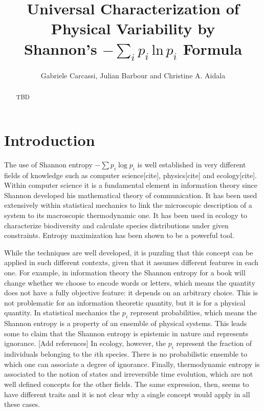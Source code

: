 \documentclass{article}
\title{Universal Characterization of Physical Variability by \\Shannon's $-\sum_ip_i\,\textrm{ln}\,p_i$ Formula}
\author{
	Gabriele Carcassi,
	Julian Barbour and
	Christine A. Aidala 
}
\begin{document}
\maketitle

\tableofcontents

\begin{abstract}
TBD
\end{abstract}




\section{Introduction\label{int}}

The use of Shannon entropy $-\sum p_i \log p_i$ is well established in very different fields of knowledge such as computer science[cite], physics[cite] and ecology[cite]. Within computer science it is a fundamental element in information theory since Shannon developed his mathematical theory of communication. It has been used extensively within statistical mechanics to link the microscopic description of a system to its macroscopic thermodynamic one. It has been used in ecology to characterize biodiversity and calculate species distributions under given constraints. Entropy maximization has been shown to be a powerful tool.

While the techniques are well developed, it is puzzling that this concept can be applied in such different contexts, given that it assumes different features in each one. For example, in information theory the Shannon entropy for a book will change whether we choose to encode words or letters, which means the quantity does not have a fully objective feature: it depends on an arbitrary choice. This is not problematic for an information theoretic quantity, but it is for a physical quantity. In statistical mechanics the $p_i$ represent probabilities, which means the Shannon entropy is a property of an ensemble of physical systems. This leads some to claim that the Shannon entropy is epistemic in nature and represents ignorance. [Add references] In ecology, however, the $p_i$ represent the fraction of individuals belonging to the $i$th species. There is no probabilistic ensemble to which one can associate a degree of ignorance. Finally, thermodynamic entropy is associated to the notion of states and irreversible time evolution, which are not well defined concepts for the other fields. The same expression, then, seems to have different traits and it is not clear why a single concept would apply in all these cases.
\end{document}
